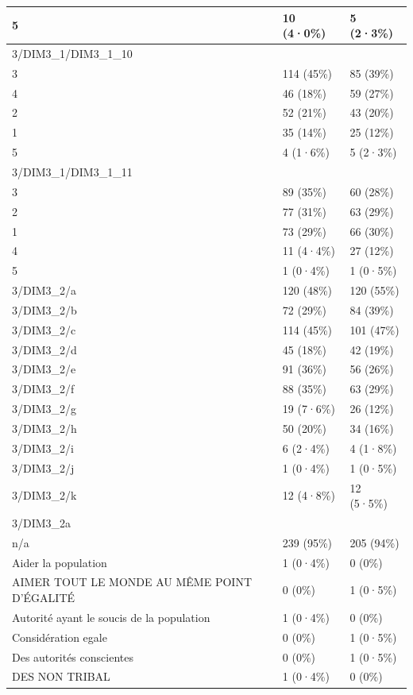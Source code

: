 \documentclass[
]{book}
\begin{document}
\begin{tabular}{l|l|l}
\hline
5 & 10 (4·0\%) & 5 (2·3\%)\\
\hline
3/DIM3\_1/DIM3\_1\_10 &  & \\
\hline
3 & 114 (45\%) & 85 (39\%)\\
\hline
4 & 46 (18\%) & 59 (27\%)\\
\hline
2 & 52 (21\%) & 43 (20\%)\\
\hline
1 & 35 (14\%) & 25 (12\%)\\
\hline
5 & 4 (1·6\%) & 5 (2·3\%)\\
\hline
3/DIM3\_1/DIM3\_1\_11 &  & \\
\hline
3 & 89 (35\%) & 60 (28\%)\\
\hline
2 & 77 (31\%) & 63 (29\%)\\
\hline
1 & 73 (29\%) & 66 (30\%)\\
\hline
4 & 11 (4·4\%) & 27 (12\%)\\
\hline
5 & 1 (0·4\%) & 1 (0·5\%)\\
\hline
3/DIM3\_2/a & 120 (48\%) & 120 (55\%)\\
\hline
3/DIM3\_2/b & 72 (29\%) & 84 (39\%)\\
\hline
3/DIM3\_2/c & 114 (45\%) & 101 (47\%)\\
\hline
3/DIM3\_2/d & 45 (18\%) & 42 (19\%)\\
\hline
3/DIM3\_2/e & 91 (36\%) & 56 (26\%)\\
\hline
3/DIM3\_2/f & 88 (35\%) & 63 (29\%)\\
\hline
3/DIM3\_2/g & 19 (7·6\%) & 26 (12\%)\\
\hline
3/DIM3\_2/h & 50 (20\%) & 34 (16\%)\\
\hline
3/DIM3\_2/i & 6 (2·4\%) & 4 (1·8\%)\\
\hline
3/DIM3\_2/j & 1 (0·4\%) & 1 (0·5\%)\\
\hline
3/DIM3\_2/k & 12 (4·8\%) & 12 (5·5\%)\\
\hline
3/DIM3\_2a &  & \\
\hline
n/a & 239 (95\%) & 205 (94\%)\\
\hline
Aider la population & 1 (0·4\%) & 0 (0\%)\\
\hline
AIMER TOUT LE MONDE AU MÊME POINT D'ÉGALITÉ & 0 (0\%) & 1 (0·5\%)\\
\hline
Autorité ayant le soucis de la population & 1 (0·4\%) & 0 (0\%)\\
\hline
Considération  egale & 0 (0\%) & 1 (0·5\%)\\
\hline
Des autorités conscientes & 0 (0\%) & 1 (0·5\%)\\
\hline
DES NON TRIBAL & 1 (0·4\%) & 0 (0\%)\\

\end{tabular}
\end{document}
